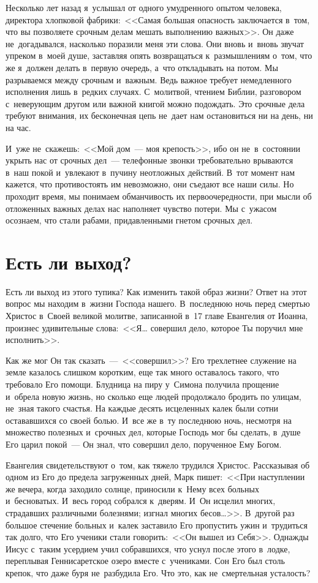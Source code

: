 \documentclass[12pt,article,a4paper,fittopage]{ncc}
\begin{document}
\begin{multicols}{2}
Несколько лет назад я~услышал от одного умудренного опытом человека, директора хлопковой фабрики:\ <<Самая большая опасность заключается в~том, что вы позволяете срочным делам мешать выполнению важных>>. Он даже не~догадывался, насколько поразили меня эти слова. Они вновь и~вновь звучат упреком в~моей душе, заставляя опять возвращаться к~размышлениям о~том, что же я~должен делать в~первую очередь, а~что откладывать на потом. Мы разрываемся между срочным и~важным. Ведь важное требует немедленного исполнения лишь в~редких случаях. С~молитвой, чтением Библии, разговором с~неверующим другом или важной книгой можно подождать. Это срочные дела требуют внимания, их бесконечная цепь не~дает нам остановиться ни на день, ни на час.

И~уже не~скажешь:\ <<Мой дом~--- моя крепость>>, ибо он не~в~состоянии укрыть нас от срочных дел~--- телефонные звонки требовательно врываются в~наш покой и~увлекают в~пучину неотложных действий. В~тот момент нам кажется, что противостоять им невозможно, они съедают все наши силы. Но проходит время, мы понимаем обманчивость их первоочередности, при мысли об отложенных важных делах нас наполняет чувство потери. Мы с~ужасом осознаем, что стали рабами, придавленными гнетом срочных дел.

\section*{Есть ли выход?}

Есть ли выход из этого тупика? Как изменить такой образ жизни? Ответ на этот вопрос мы находим в~жизни Господа нашего. В~последнюю ночь перед смертью Христос в~Своей великой молитве, записанной в~17 главе Евангелия от Иоанна, произнес удивительные слова:\ <<Я\ldots{} совершил дело, которое Ты поручил мне исполнить>>.  

Как же мог Он так сказать~---\ <<совершил>>? Его трехлетнее служение на земле казалось слишком коротким, еще так много оставалось такого, что требовало Его помощи. Блудница на пиру у~Симона получила прощение и~обрела новую жизнь, но сколько еще людей продолжало бродить по улицам, не~зная такого счастья. На каждые десять исцеленных калек были сотни остававшихся со своей болью. И~все же в~ту последнюю ночь, несмотря на множество полезных и~срочных дел, которые Господь мог бы сделать, в~душе Его царил покой~--- Он знал, что совершил дело, порученное Ему Богом.

Евангелия свидетельствуют о~том, как тяжело трудился Христос. Рассказывая об одном из Его до предела загруженных дней, Марк пишет:\ <<При наступлении же вечера, когда заходило солнце, приносили к~Нему всех больных и~бесноватых. И~весь город собрался к~дверям. И~Он исцелил многих, страдавших различными болезнями; изгнал многих бесов\ldots{}>>. В~другой раз большое стечение больных и~калек заставило Его пропустить ужин и~трудиться так долго, что Его ученики стали говорить:\ <<Он вышел из Себя>>. Однажды Иисус с~таким усердием учил собравшихся, что уснул после этого в~лодке, переплывая Геннисаретское озеро вместе с~учениками. Сон Его был столь крепок, что даже буря не~разбудила Его. Что это, как не~смертельная усталость?


\end{multicols}
\end{document}
